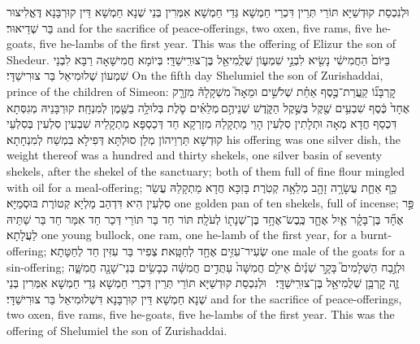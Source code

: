 {וּלְנִכְסַת קוּדְשַׁיָּא תּוֹרֵי תְּרֵין דִּכְרֵי חַמְשָׁא גְּדֵי חַמְשָׁא אִמְּרִין בְּנֵי שְׁנָא חַמְשָׁא דֵּין קוּרְבָּנָא דֶּאֱלִיצוּר בַּר שְׁדֵיאוּר׃}
{and for the sacrifice of peace-offerings, two oxen, five rams, five he-goats, five he-lambs of the first year. This was the offering of Elizur the son of Shedeur.}{}
{בַּיּוֹם֙ הַחֲמִישִׁ֔י נָשִׂ֖יא לִבְנֵ֣י שִׁמְע֑וֹן שְׁלֻֽמִיאֵ֖ל בֶּן־צוּרִֽישַׁדָּֽי׃}
{בְּיוֹמָא חֲמִישָׁאָה רַבָּא לִבְנֵי שִׁמְעוֹן שְׁלוּמִיאֵל בַּר צוּרִישַׁדָּי׃}
{On the fifth day Shelumiel the son of Zurishaddai, prince of the children of Simeon:}{}
{קׇרְבָּנ֞וֹ קַֽעֲרַת־כֶּ֣סֶף אַחַ֗ת שְׁלֹשִׁ֣ים וּמֵאָה֮ מִשְׁקָלָהּ֒ מִזְרָ֤ק אֶחָד֙ כֶּ֔סֶף שִׁבְעִ֥ים שֶׁ֖קֶל בְּשֶׁ֣קֶל הַקֹּ֑דֶשׁ שְׁנֵיהֶ֣ם \legarmeh  מְלֵאִ֗ים סֹ֛לֶת בְּלוּלָ֥ה בַשֶּׁ֖מֶן לְמִנְחָֽה׃}
{קוּרְבָּנֵיהּ מְגִסְּתָא דִּכְסַף חֲדָא מְאָה וּתְלָתִין סִלְעִין הָוֵי מַתְקָלַהּ מִזְרְקָא חַד דְּכַסְפָּא מַתְקָלֵיהּ שִׁבְעִין סִלְעִין בְּסִלְעֵי קוּדְשָׁא תַּרְוֵיהוֹן מְלַן סוּלְתָּא דְּפִילָא בִמְשַׁח לְמִנְחָתָא׃}
{his offering was one silver dish, the weight thereof was a hundred and thirty shekels, one silver basin of seventy shekels, after the shekel of the sanctuary; both of them full of fine flour mingled with oil for a meal-offering;}{}
{כַּ֥ף אַחַ֛ת עֲשָׂרָ֥ה זָהָ֖ב מְלֵאָ֥ה קְטֹֽרֶת׃}
{בָּזִכָּא חֲדָא מַתְקָלַהּ עֲשַׂר סִלְעִין הִיא דִּדְהַב מַלְיָא קְטוֹרֶת בּוּסְמַיָּא׃}
{one golden pan of ten shekels, full of incense;}{}
{פַּ֣ר אֶחָ֞ד בֶּן־בָּקָ֗ר אַ֧יִל אֶחָ֛ד כֶּֽבֶשׂ־אֶחָ֥ד בֶּן־שְׁנָת֖וֹ לְעֹלָֽה׃}
{תּוֹר חַד בַּר תּוֹרֵי דְּכַר חַד אִמַּר חַד בַּר שַׁתֵּיהּ לַעֲלָתָא׃}
{one young bullock, one ram, one he-lamb of the first year, for a burnt-offering;}{}
{שְׂעִיר־עִזִּ֥ים אֶחָ֖ד לְחַטָּֽאת׃}
{צְפִיר בַּר עִזִּין חַד לְחַטָּתָא׃}
{one male of the goats for a sin-offering;}{}
{וּלְזֶ֣בַח הַשְּׁלָמִים֮ בָּקָ֣ר שְׁנַ֒יִם֒ אֵילִ֤ם חֲמִשָּׁה֙ עַתֻּדִ֣ים חֲמִשָּׁ֔ה כְּבָשִׂ֥ים בְּנֵי־שָׁנָ֖ה חֲמִשָּׁ֑ה זֶ֛ה קׇרְבַּ֥ן שְׁלֻמִיאֵ֖ל בֶּן־צוּרִֽישַׁדָּֽי׃ \petucha }
{וּלְנִכְסַת קוּדְשַׁיָּא תּוֹרֵי תְּרֵין דִּכְרֵי חַמְשָׁא גְּדֵי חַמְשָׁא אִמְּרִין בְּנֵי שְׁנָא חַמְשָׁא דֵּין קוּרְבָּנָא דִּשְׁלוּמִיאֵל בַּר צוּרִישַׁדָּי׃}
{and for the sacrifice of peace-offerings, two oxen, five rams, five he-goats, five he-lambs of the first year. This was the offering of Shelumiel the son of Zurishaddai.}{}
